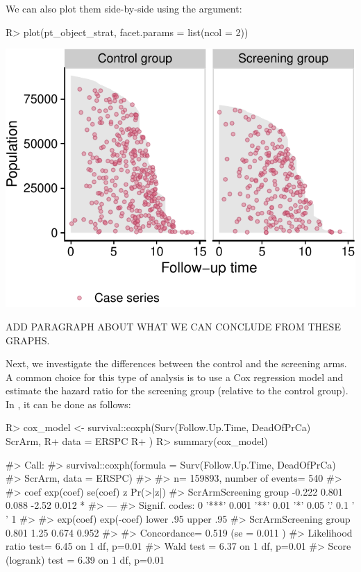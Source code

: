 \documentclass[
]{jss}
\begin{document}
We can also plot them side-by-side using the  argument:

\begin{CodeChunk}

\begin{CodeInput}
R> plot(pt_object_strat, facet.params = list(ncol = 2))
\end{CodeInput}


\begin{center}\includegraphics{../figures/plot-stratified-erspc-data-side-1} \end{center}

\end{CodeChunk}

ADD PARAGRAPH ABOUT WHAT WE CAN CONCLUDE FROM THESE GRAPHS.

Next, we investigate the differences between the control and the
screening arms. A common choice for this type of analysis is to use a
Cox regression model and estimate the hazard ratio for the screening
group (relative to the control group). In , it can be done
as follows:

\begin{CodeChunk}

\begin{CodeInput}
R> cox_model <- survival::coxph(Surv(Follow.Up.Time, DeadOfPrCa) ~ ScrArm,
R+   data = ERSPC
R+ )
R> summary(cox_model)
\end{CodeInput}

\begin{CodeOutput}
#> Call:
#> survival::coxph(formula = Surv(Follow.Up.Time, DeadOfPrCa) ~ 
#>     ScrArm, data = ERSPC)
#> 
#>   n= 159893, number of events= 540 
#> 
#>                         coef exp(coef) se(coef)     z Pr(>|z|)  
#> ScrArmScreening group -0.222     0.801    0.088 -2.52    0.012 *
#> ---
#> Signif. codes:  0 '***' 0.001 '**' 0.01 '*' 0.05 '.' 0.1 ' ' 1
#> 
#>                       exp(coef) exp(-coef) lower .95 upper .95
#> ScrArmScreening group     0.801       1.25     0.674     0.952
#> 
#> Concordance= 0.519  (se = 0.011 )
#> Likelihood ratio test= 6.45  on 1 df,   p=0.01
#> Wald test            = 6.37  on 1 df,   p=0.01
#> Score (logrank) test = 6.39  on 1 df,   p=0.01
\end{CodeOutput}
\end{CodeChunk}
\end{document}
